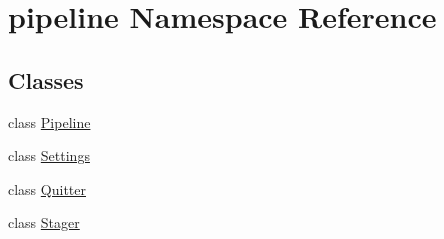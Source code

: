 \hypertarget{namespacepipeline}{\section{pipeline \-Namespace \-Reference}
\label{namespacepipeline}
}
\subsection*{\-Classes}
\begin{DoxyCompactItemize}
\item 
class \hyperlink{classpipeline_1_1_pipeline}{\-Pipeline}
\item 
class \hyperlink{classpipeline_1_1_settings}{\-Settings}
\item 
class \hyperlink{classpipeline_1_1_quitter}{\-Quitter}
\item 
class \hyperlink{classpipeline_1_1_stager}{\-Stager}
\end{DoxyCompactItemize}
